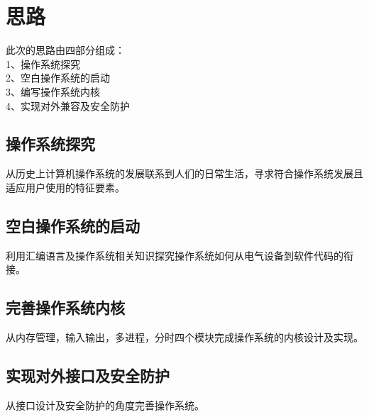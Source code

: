 \chapter{思路}

此次的思路由四部分组成：\\
\hspace*{1.5cm}1、操作系统探究 \\
\hspace*{1.5cm}2、空白操作系统的启动 \\
\hspace*{1.5cm}3、编写操作系统内核 \\
\hspace*{1.5cm}4、实现对外兼容及安全防护

\section{操作系统探究}
从历史上计算机操作系统的发展联系到人们的日常生活，寻求符合操作系统发展且适应用户使用的特征要素。

\section{空白操作系统的启动}
利用汇编语言及操作系统相关知识探究操作系统如何从电气设备到软件代码的衔接。

\section{完善操作系统内核}
从内存管理，输入输出，多进程，分时四个模块完成操作系统的内核设计及实现。

\section{实现对外接口及安全防护}
从接口设计及安全防护的角度完善操作系统。